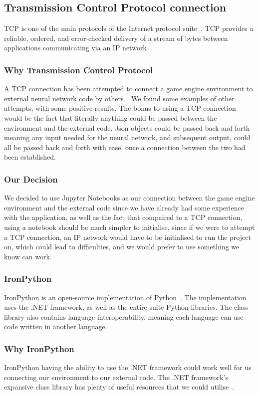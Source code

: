 \subsection{Transmission Control Protocol connection}
TCP is one of the main protocols of the Internet protocol suite~\cite{TCP}. 
TCP provides a reliable, ordered, and error-checked delivery of a stream of bytes between applications communicating via an IP network~\cite{TCPsdx}. 

\subsubsection{Why Transmission Control Protocol}
A TCP connection has been attempted to connect a game engine environment to external neural network code by others~\cite{UnityTCP}. We found some examples of other attempts, with some positive results. The bonus to using a TCP connection would be the fact that literally anything could be passed between the environment and the external code. Json objects could be passed back and forth meaning any input needed for the neural network, and subsequent output, could all be passed back and forth with ease, once a connection between the two had been established.

\subsubsection{Our Decision}
We decided to use Jupyter Notebooks as our connection between the game engine environment and the external code since we have already had some experience with the application, as well as the fact that compaired to a TCP connection, using a notebook should be much simpler to initialise, since if we were to attempt a TCP connection, an IP network would have to be initialised to run the project on, which could lead to difficulties, and we would prefer to use something we know can work.

\subsubsection{IronPython}
IronPython is an open-source implementation of Python~\cite{ironPython}. The implementation uses the .NET framework, as well as the entire suite Python libraries. The class library also contains language interoperability, meaning each language can use code written in another language.

\subsubsection{Why IronPython}
IronPython having the ability to use the .NET framework could work well for us connecting our environment to our external code. The .NET framework’s expansive class library has plenty of useful resources that we could utilise~\cite{foord2009ironpython}.

